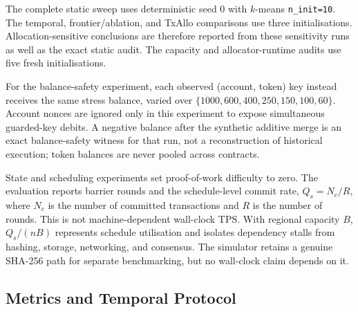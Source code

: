 \documentclass[runningheads]{llncs}
\begin{document}
The complete static sweep uses deterministic seed 0 with $k$-means
\texttt{n\_init=10}. The temporal, frontier/ablation, and TxAllo comparisons use
three initialisations. Allocation-sensitive conclusions are therefore reported
from these sensitivity runs as well as the exact static audit.
The capacity and allocator-runtime audits use five fresh initialisations.

For the balance-safety experiment, each observed (account, token) key instead
receives the same stress balance, varied over
$\{1000,600,400,250,150,100,60\}$. Account nonces are ignored only in this
experiment to expose simultaneous guarded-key debits. A negative balance after
the synthetic additive merge is an exact balance-safety witness for that run,
not a reconstruction of historical execution; token balances are never pooled
across contracts.

State and scheduling experiments set proof-of-work difficulty to zero. The
evaluation reports barrier rounds and the schedule-level commit rate,
$Q_s=N_c/R$, where $N_c$ is the number of committed transactions and $R$ is the
number of rounds. This is not machine-dependent wall-clock TPS. With regional
capacity $B$, $Q_s/(nB)$ represents schedule utilisation and isolates dependency
stalls from hashing, storage, networking, and consensus. The simulator retains
a genuine SHA-256 path for separate benchmarking, but no wall-clock claim
depends on it.

\subsection{Metrics and Temporal Protocol}
\end{document}
